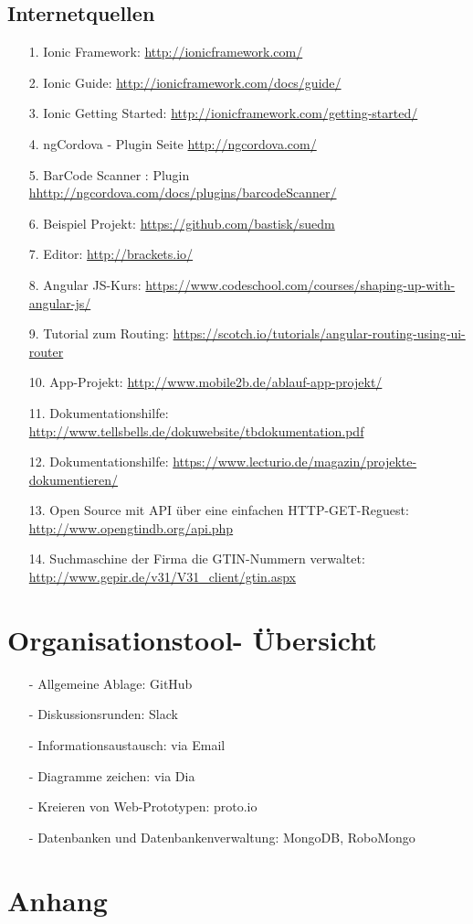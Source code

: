 \documentclass[12pt,a4paper]{article}
\begin{document}
\subsection*{Internetquellen}
\begin{itemize}
\item[1.]Ionic Framework: \url{http://ionicframework.com/}
\item[2.]Ionic Guide: \url{http://ionicframework.com/docs/guide/}
\item[3.]Ionic Getting Started: \url{http://ionicframework.com/getting-started/}
\item[4.]ngCordova - Plugin Seite \url{http://ngcordova.com/}
\item[5.]BarCode Scanner : Plugin \url{hhttp://ngcordova.com/docs/plugins/barcodeScanner/}
\item[6.]Beispiel Projekt: \url{https://github.com/bastisk/suedm}
\item[7.]Editor: \url{http://brackets.io/}
\item[8.]Angular JS-Kurs: \url{https://www.codeschool.com/courses/shaping-up-with-angular-js/}
\item[9.]Tutorial zum Routing: \url{https://scotch.io/tutorials/angular-routing-using-ui-router}
\item[10.]App-Projekt: \url{http://www.mobile2b.de/ablauf-app-projekt/}
\item[11.] Dokumentationshilfe: \url{http://www.tellsbells.de/dokuwebsite/tbdokumentation.pdf}
\item[12.] Dokumentationshilfe: \url{https://www.lecturio.de/magazin/projekte-dokumentieren/}
\item[13.] Open Source mit API über eine einfachen HTTP-GET-Reguest: \url{http://www.opengtindb.org/api.php}
\item[14.] Suchmaschine der Firma die GTIN-Nummern verwaltet: \url{http://www.gepir.de/v31/V31_client/gtin.aspx}
\end{itemize}

\newpage
\section*{Organisationstool- Übersicht}
\begin{itemize}
\item[-]Allgemeine Ablage: GitHub
\item[-]Diskussionsrunden: Slack
\item[-]Informationsaustausch: via Email
\item[-]Diagramme zeichen: via Dia 
\item[-]Kreieren von Web-Prototypen: proto.io
\item[-]Datenbanken und Datenbankenverwaltung: MongoDB, RoboMongo
\end{itemize}
\newpage
\section*{Anhang}
\end{document}
